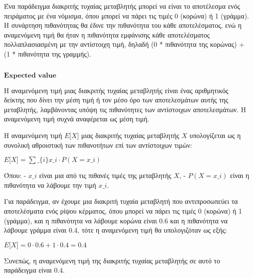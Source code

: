 \documentclass[11pt]{article}
\makeatletter
\newcommand{\boxspacing}{\kern\kvtcb@left@rule\kern\kvtcb@boxsep}
\newcommand{\prompt}[4]{
        {\ttfamily\llap{{\color{#2}[#3]:\hspace{3pt}#4}}\vspace{-\baselineskip}}
    }
\makeatother
\begin{document}
Ένα παράδειγμα διακριτής τυχαίας μεταβλητής μπορεί να είναι το
αποτέλεσμα ενός πειράματος με ένα νόμισμα, όπου μπορεί να πάρει τις
τιμές 0 (κορώνα) ή 1 (γράμμα). Η συνάρτηση πιθανότητας θα έδινε την
πιθανότητα του κάθε αποτελέσματος, ενώ η αναμενόμενη τιμή θα ήταν η
πιθανότητα εμφάνισης κάθε αποτελέσματος πολλαπλασιασμένη με την
αντίστοιχη τιμή, δηλαδή (0 * πιθανότητα της κορώνας) + (1 * πιθανότητα
της γραμμής).

    \begin{tcolorbox}[breakable, size=fbox, boxrule=1pt, pad at break*=1mm,colback=cellbackground, colframe=cellborder]
\prompt{In}{incolor}{ }{\boxspacing}
\begin{Verbatim}[commandchars=\\\{\}]

\end{Verbatim}
\end{tcolorbox}

    \(\textbf{Expected value}\)

    Η αναμενόμενη τιμή μιας διακριτής τυχαίας μεταβλητής είναι ένας
αριθμητικός δείκτης που δίνει την μέση τιμή ή τον μέσο όρο των
αποτελεσμάτων αυτής της μεταβλητής, λαμβάνοντας υπόψη τις πιθανότητες
των αντίστοιχων αποτελεσμάτων. Η αναμενόμενη τιμή συχνά αναφέρεται ως
μέση τιμή.

Η αναμενόμενη τιμή $ E{[}X{]} $ μιας διακριτής τυχαίας μεταβλητής $ X
$ υπολογίζεται ως η συνολική αθροιστική των πιθανοτήτων επί των
αντίστοιχων τιμών:

$ E{[}X{]} = \sum\_\{i\} x\_i \cdot P(X = x\_i) $

Όπου: - $ x\_i $ είναι μια από τις πιθανές τιμές της μεταβλητής $ X
$, - $ P(X = x\_i) $ είναι η πιθανότητα να λάβουμε την τιμή $ x\_i
$.

Για παράδειγμα, αν έχουμε μια διακριτή τυχαία μεταβλητή που
αντιπροσωπεύει τα αποτελέσματα ενός ρίψου κέρματος, όπου μπορεί να πάρει
τις τιμές 0 (κορώνα) ή 1 (γράμμα), και η πιθανότητα να λάβουμε κορώνα
είναι 0.6 και η πιθανότητα να λάβουμε γράμμα είναι 0.4, τότε η
αναμενόμενη τιμή θα υπολογιζόταν ως εξής:

$ E{[}X{]} = 0 \cdot 0.6 + 1 \cdot 0.4 = 0.4 $

Συνεπώς, η αναμενόμενη τιμή της διακριτής τυχαίας μεταβλητής σε αυτό το
παράδειγμα είναι 0.4.

    \begin{tcolorbox}[breakable, size=fbox, boxrule=1pt, pad at break*=1mm,colback=cellbackground, colframe=cellborder]
\prompt{In}{incolor}{ }{\boxspacing}
\begin{Verbatim}[commandchars=\\\{\}]

\end{Verbatim}
\end{tcolorbox}
\end{document}

